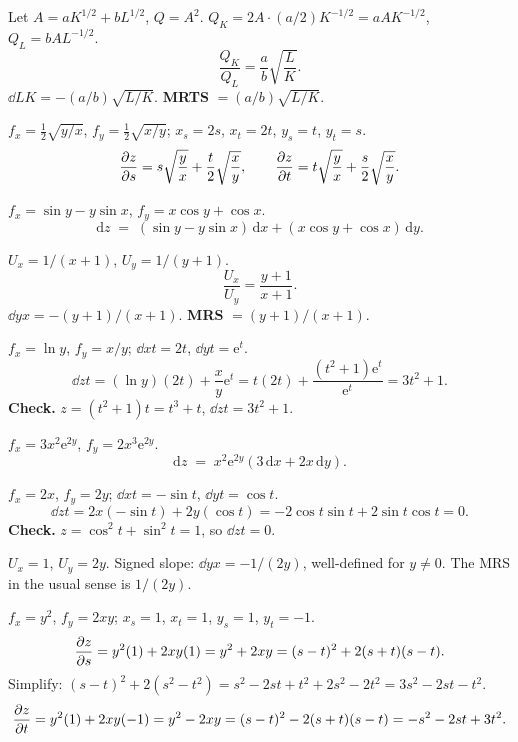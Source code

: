 \begin{solutions}
  \item Let $A=aK^{1/2}+bL^{1/2}$, $Q=A^{2}$. $Q_{K}=2A\cdot(a/2)K^{-1/2}
        =aAK^{-1/2}$, $Q_{L}=bAL^{-1/2}$.
        \[
          \frac{Q_{K}}{Q_{L}}=\frac{a}{b}\sqrt{\frac{L}{K}} .
        \]
        $\dd{L}{K}=-(a/b)\sqrt{L/K}$. \textbf{MRTS} $=(a/b)\sqrt{L/K}$.

  \item $f_{x}=\tfrac12\sqrt{y/x}$, $f_{y}=\tfrac12\sqrt{x/y}$;
        $x_{s}=2s$, $x_{t}=2t$, $y_{s}=t$, $y_{t}=s$.
        \[
          \frac{\partial z}{\partial s}=s\sqrt{\frac{y}{x}}+\frac{t}{2}\sqrt{\frac{x}{y}},\qquad
          \frac{\partial z}{\partial t}=t\sqrt{\frac{y}{x}}+\frac{s}{2}\sqrt{\frac{x}{y}} .
        \]

  \item $f_{x}=\sin y-y\sin x$, $f_{y}=x\cos y+\cos x$.
        \[
          \mathrm{d}z \;=\; (\sin y-y\sin x)\,\mathrm{d}x
            +(x\cos y+\cos x)\,\mathrm{d}y .
        \]

  \item $U_{x}=1/(x+1)$, $U_{y}=1/(y+1)$.
        \[
          \frac{U_{x}}{U_{y}}=\frac{y+1}{x+1} .
        \]
        $\dd{y}{x}=-(y+1)/(x+1)$. \textbf{MRS} $=(y+1)/(x+1)$.

  \item $f_{x}=\ln y$, $f_{y}=x/y$; $\dd{x}{t}=2t$, $\dd{y}{t}=\mathrm{e}^{t}$.
        \[
          \dd{z}{t}=(\ln y)(2t)+\frac{x}{y}\mathrm{e}^{t}
            =t(2t)+\frac{(t^{2}+1)\mathrm{e}^{t}}{\mathrm{e}^{t}}
            =3t^{2}+1 .
        \]
        \textbf{Check.} $z=(t^{2}+1)t=t^{3}+t$, $\dd{z}{t}=3t^{2}+1$.
        \checkmark

  \item $f_{x}=3x^{2}\mathrm{e}^{2y}$, $f_{y}=2x^{3}\mathrm{e}^{2y}$.
        \[
          \mathrm{d}z \;=\; x^{2}\mathrm{e}^{2y}(3\,\mathrm{d}x+2x\,\mathrm{d}y) .
        \]

  \item $f_{x}=2x$, $f_{y}=2y$; $\dd{x}{t}=-\sin t$, $\dd{y}{t}=\cos t$.
        \[
          \dd{z}{t}=2x(-\sin t)+2y(\cos t)=-2\cos t\sin t+2\sin t\cos t=0 .
        \]
        \textbf{Check.} $z=\cos^{2}t+\sin^{2}t=1$, so $\dd{z}{t}=0$.
        \checkmark

  \item $U_{x}=1$, $U_{y}=2y$. Signed slope: $\dd{y}{x}=-1/(2y)$,
        well-defined for $y\neq 0$. The MRS in the usual sense is
        $1/(2y)$.

  \item $f_{x}=y^{2}$, $f_{y}=2xy$; $x_{s}=1$, $x_{t}=1$, $y_{s}=1$,
        $y_{t}=-1$.
        \[
          \frac{\partial z}{\partial s}=y^{2}(1)+2xy(1)=y^{2}+2xy=(s-t)^{2}+2(s+t)(s-t) .
        \]
        Simplify: $(s-t)^{2}+2(s^{2}-t^{2})=s^{2}-2st+t^{2}+2s^{2}-2t^{2}
          =3s^{2}-2st-t^{2}$.
        \[
          \frac{\partial z}{\partial t}=y^{2}(1)+2xy(-1)=y^{2}-2xy=(s-t)^{2}-2(s+t)(s-t)
            =-s^{2}-2st+3t^{2} .
        \]


\end{solutions}

